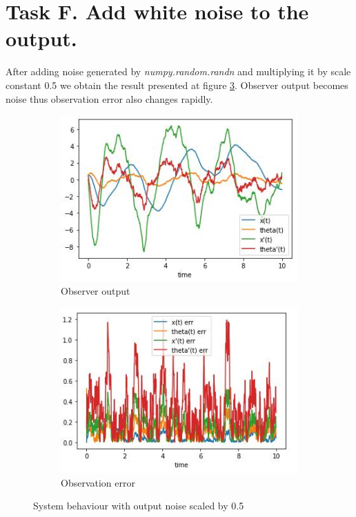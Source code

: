 \documentclass[12pt,letterpaper]{article}
\begin{document}
\section*{Task F. Add white noise to the output.}
\label{Q:F}
    After adding noise generated by \textit{numpy.random.randn} and multiplying it by scale constant 0.5 we obtain the result presented at figure \ref{fig:output_noise_05}. Observer output becomes noise thus observation error also changes rapidly.

    
    \begin{figure}[htb]
        \begin{subfigure}{.5\textwidth}
            \centering
        \includegraphics[width=1\linewidth]{images/filter/output_noise_05.jpg}
        \caption{Observer output}
        \label{fig:output_noise_05_obs}
        \end{subfigure}
        \begin{subfigure}{.5\textwidth}
          \centering
          \includegraphics[width=1\linewidth]{images/filter/output_noise_05_err.jpg}
          \caption{Observation error}
        \label{fig:output_noise_05_err}
        \end{subfigure}
    \caption{System behaviour with output noise scaled by 0.5}
    \label{fig:output_noise_05}
    \end{figure}
\end{document}
